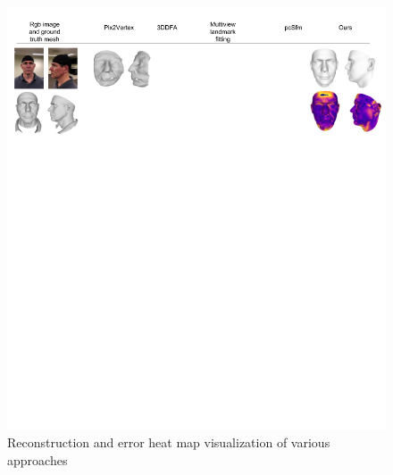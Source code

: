 \documentclass[10pt,twocolumn,letterpaper]{article}
\begin{document}
\begin{figure}
\begin{center}
   \includegraphics[width=0.95\linewidth]{images/ICCV_verticals.png}
\end{center}
  \caption{Reconstruction and error heat map visualization of various approaches}
\label{fig:results}
\end{figure}

\end{document}
